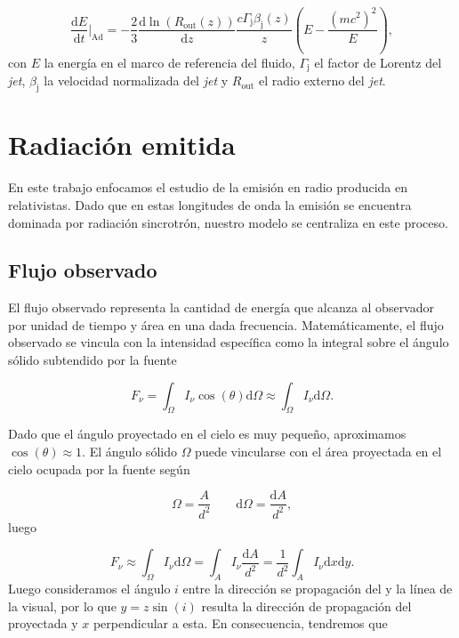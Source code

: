 \begin{equation}\label{eq:mod-3}
 \frac{\mathrm{d}E}{\mathrm{d}t}\Bigg|_{\mathrm{Ad}}=-\frac{2}{3}\frac{\mathrm{d}\ln(R_\mathrm{out}(z))}{\mathrm{d}z}\frac{c\Gamma_\mathrm{j}\beta_\mathrm{j}(z)}{z}\left(E-\frac{(mc^2)^2}{E}\right), 
\end{equation}
con $E$ la energía en el marco de referencia del fluido, $\Gamma_\mathrm{j}$ el factor de Lorentz del \textit{jet}, $\beta_\mathrm{j}$ la velocidad normalizada del \textit{jet} y $R_\mathrm{out}$ el radio externo del \textit{jet}. 


\section{Radiación emitida}

	En este trabajo enfocamos el estudio de la emisión en radio producida en \jets relativistas.
	Dado que en estas longitudes de onda la emisión se encuentra dominada por radiación sincrotrón, nuestro modelo se centraliza en este proceso.


\subsection{Flujo observado}\label{subsec:flujo}

	El flujo observado representa la cantidad de energía que alcanza al observador por unidad de tiempo y área en una dada frecuencia.
	Matemáticamente, el flujo observado se vincula con la intensidad específica como la integral sobre el \'angulo s\'olido subtendido por la fuente

\begin{equation}\label{eq:mod-22}
F_\nu=\int_\Omega I_\nu \cos(\theta)\mathrm{d}\Omega \approx\int_\Omega I_\nu \mathrm{d}\Omega.
\end{equation}

	Dado que el ángulo proyectado en el cielo es muy pequeño, aproximamos $\cos(\theta)\approx 1$.
	El \'angulo s\'olido $\Omega$ puede vincularse con el \'area proyectada en el cielo ocupada por la fuente seg\'un

\begin{equation*}
\Omega=\frac{A}{d^2} \qquad \mathrm{d}\Omega=\frac{\mathrm{d}A}{d^2},
\end{equation*}
luego

\begin{equation}\label{eq:mod-23}
F_\nu\approx\int_\Omega I_\nu \mathrm{d}\Omega=\int_A I_\nu \frac{\mathrm{d}A}{d^2} =\frac{1}{d^2}\int_A I_\nu \mathrm{d}x\mathrm{d}y.
\end{equation}
Luego consideramos el \'angulo $i$ entre la direcci\'on se propagaci\'on del \jet y la l\'inea de la visual, por lo que $y=z\sin(i)$ resulta la dirección de propagación del \jet proyectada y $x$ perpendicular a esta. En consecuencia, tendremos que

